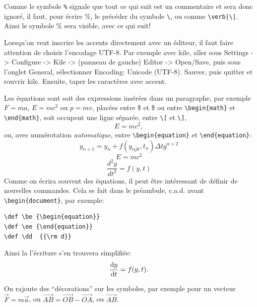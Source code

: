 \documentclass[a4paper,12pt,twoside]{article}
\def \be {\begin{equation}}
\def \ee {\end{equation}}
\def \dd  {{\rm d}}
\begin{document}
Comme le symbole \verb|%| signale que tout ce qui suit est un commentaire et sera donc ignor\'e, il faut, pour \'ecrire \%, le pr\'ec\'eder du symbole \verb|\|, ou comme \verb+\verb|\|+.
Ainsi le symbole \% sera visible, avec ce qui suit!

Lorsqu'on veut inscrire les accents directement avec un éditeur, il faut faire attention de
choisir l'encodage UTF-8. Par exemple avec kile, aller sous Settings -> Configure -> Kile -> (panneau de gauche) Editor -> Open/Save, puis sous l'onglet General, s\'electionner Encoding: Unicode (UTF-8). Sauver, puis quitter et rouvrir kile. Ensuite, taper les caractères avec accent.

Les \'equations sont soit des expressions ins\'er\'ees dans un paragraphe, par exemple
$F=ma$, \(E=mc^2\) ou \begin{math} p=mv \end{math},
plac\'ees entre \$ et \$ ou entre \verb|\begin{math}| et \verb|\end{math}|,
soit occupent une ligne s\'epar\'ee, entre \verb|\[| et \verb|\]|,
\[ E=mc^2, \]
ou, avec num\'erotation {\it automatique}, entre \verb|\begin{equation}|
et \verb|\end{equation}|:
\begin{equation}
y_{n+1}=y_n+f(y_{njk},t_n)\Delta t g^{\alpha+2}
\end{equation}
\begin{equation}
E=mc^2
\end{equation}
\begin{equation}
\frac{d^2y}{dt^2} = f(y,t)
\end{equation}
Comme on \'ecrira souvent des \'equations, il peut \^etre int\'eressant de d\'efinir de nouvelles commandes. Cela se fait dans le pr\'eambule, c.a.d. avant \verb|\begin{document}|, par exemple:
\begin{verbatim}
\def \be {\begin{equation}}
\def \ee {\end{equation}}
\def \dd  {{\rm d}}
\end{verbatim}
Ainsi la l'\'ecriture s'en trouvera simplifi\'ee:
\be
\frac{\dd y}{\dd t} =    f(y,t)      . %
\ee

On rajoute des ``d\'ecorations'' sur les symboles, par exemple pour un vecteur
$\vec{F}=m\vec{a}$, ou $\vec{AB}=\vec{OB}-\vec{OA}$, ou
$\overrightarrow{AB}$.  %
\end{document}
